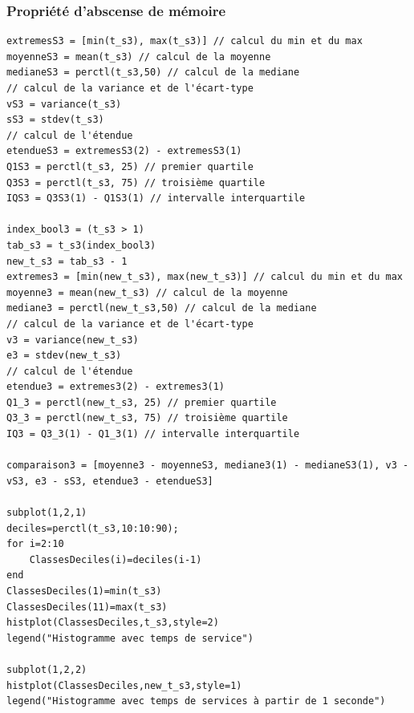 \documentclass{article}
\begin{document}
\subsubsection{Propriété d'abscense de mémoire}
\begin{verbatim}
extremesS3 = [min(t_s3), max(t_s3)] // calcul du min et du max
moyenneS3 = mean(t_s3) // calcul de la moyenne
medianeS3 = perctl(t_s3,50) // calcul de la mediane
// calcul de la variance et de l'écart-type
vS3 = variance(t_s3)
sS3 = stdev(t_s3)
// calcul de l'étendue
etendueS3 = extremesS3(2) - extremesS3(1)
Q1S3 = perctl(t_s3, 25) // premier quartile
Q3S3 = perctl(t_s3, 75) // troisième quartile
IQS3 = Q3S3(1) - Q1S3(1) // intervalle interquartile

index_bool3 = (t_s3 > 1)
tab_s3 = t_s3(index_bool3)
new_t_s3 = tab_s3 - 1
extremes3 = [min(new_t_s3), max(new_t_s3)] // calcul du min et du max
moyenne3 = mean(new_t_s3) // calcul de la moyenne
mediane3 = perctl(new_t_s3,50) // calcul de la mediane
// calcul de la variance et de l'écart-type
v3 = variance(new_t_s3)
e3 = stdev(new_t_s3)
// calcul de l'étendue
etendue3 = extremes3(2) - extremes3(1)
Q1_3 = perctl(new_t_s3, 25) // premier quartile
Q3_3 = perctl(new_t_s3, 75) // troisième quartile
IQ3 = Q3_3(1) - Q1_3(1) // intervalle interquartile

comparaison3 = [moyenne3 - moyenneS3, mediane3(1) - medianeS3(1), v3 - vS3, e3 - sS3, etendue3 - etendueS3]

subplot(1,2,1)
deciles=perctl(t_s3,10:10:90);
for i=2:10
    ClassesDeciles(i)=deciles(i-1)
end
ClassesDeciles(1)=min(t_s3)
ClassesDeciles(11)=max(t_s3)
histplot(ClassesDeciles,t_s3,style=2)
legend("Histogramme avec temps de service")

subplot(1,2,2)
histplot(ClassesDeciles,new_t_s3,style=1)
legend("Histogramme avec temps de services à partir de 1 seconde")
\end{verbatim}


\begin{verbatim}
\end{verbatim}
\end{document}
